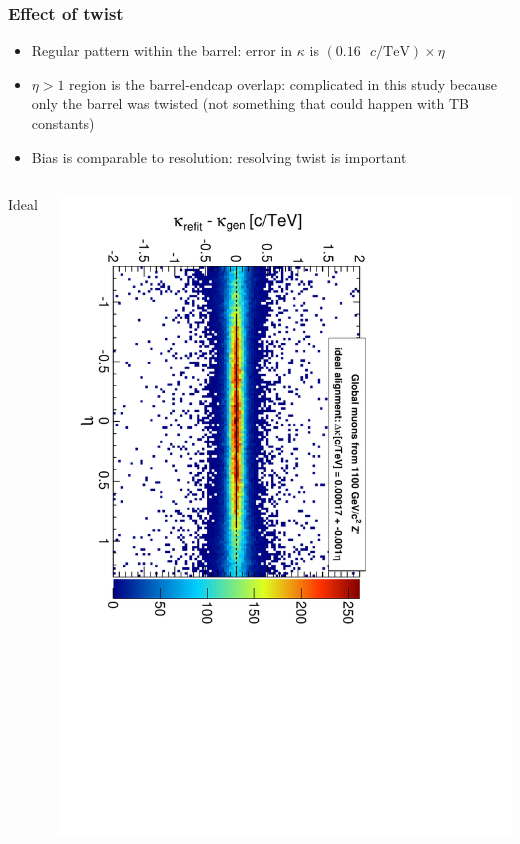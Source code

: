 \documentclass[compress]{beamer}
\begin{document}
\begin{frame}
\frametitle{Effect of twist}
\begin{itemize}
\item Regular pattern within the barrel: error in $\kappa$ is $(0.16\mbox{ $c$/TeV}) \times \eta$
\item $\eta > 1$ region is the barrel-endcap overlap: complicated in
this study because only the barrel was twisted (not something that
could happen with TB constants)
\item Bias is comparable to resolution: resolving twist is important
\end{itemize}

\begin{columns}
\begin{center}
Ideal
\end{center}
\includegraphics[height=\linewidth, angle=90]{curvbias_vseta_ideal_1100_GlobalMuons2.pdf}


\end{columns}
\end{frame}
\end{document}
